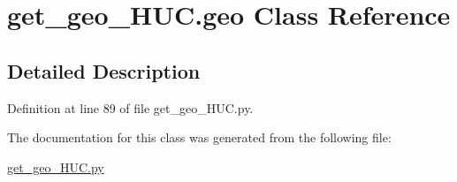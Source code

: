 \hypertarget{classget__geo___h_u_c_1_1geo}{}\section{get\+\_\+geo\+\_\+\+H\+U\+C.\+geo Class Reference}
\label{classget__geo___h_u_c_1_1geo}


\subsection{Detailed Description}


Definition at line 89 of file get\+\_\+geo\+\_\+\+H\+U\+C.\+py.



The documentation for this class was generated from the following file\+:\begin{DoxyCompactItemize}
\item 
\hyperlink{get__geo___h_u_c_8py}{get\+\_\+geo\+\_\+\+H\+U\+C.\+py}\end{DoxyCompactItemize}
